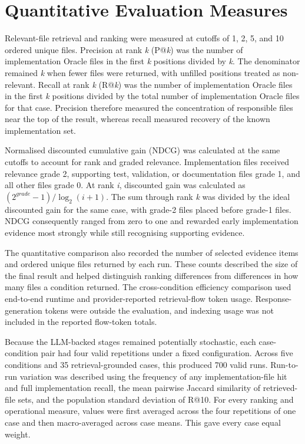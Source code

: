 \section{Quantitative Evaluation Measures}\label{sec:quantitative-evaluation-measures}

Relevant-file retrieval and ranking were measured at cutoffs of 1, 2, 5, and 10 ordered unique files. Precision at rank \emph{k} (P@\emph{k}) was the number of implementation Oracle files in the first \emph{k} positions divided by \emph{k}. The denominator remained \emph{k} when fewer files were returned, with unfilled positions treated as non-relevant. Recall at rank \emph{k} (R@\emph{k}) was the number of implementation Oracle files in the first \emph{k} positions divided by the total number of implementation Oracle files for that case. Precision therefore measured the concentration of responsible files near the top of the result, whereas recall measured recovery of the known implementation set.

Normalised discounted cumulative gain (NDCG) was calculated at the same cutoffs to account for rank and graded relevance. Implementation files received relevance grade 2, supporting test, validation, or documentation files grade 1, and all other files grade 0. At rank \emph{i}, discounted gain was calculated as $(2^{grade}-1)/\log_2(i+1)$. The sum through rank \emph{k} was divided by the ideal discounted gain for the same case, with grade-2 files placed before grade-1 files. NDCG consequently ranged from zero to one and rewarded early implementation evidence most strongly while still recognising supporting evidence.

The quantitative comparison also recorded the number of selected evidence items and ordered unique files returned by each run. These counts described the size of the final result and helped distinguish ranking differences from differences in how many files a condition returned. The cross-condition efficiency comparison used end-to-end runtime and provider-reported retrieval-flow token usage. Response-generation tokens were outside the evaluation, and indexing usage was not included in the reported flow-token totals.

Because the LLM-backed stages remained potentially stochastic, each case-condition pair had four valid repetitions under a fixed configuration. Across five conditions and 35 retrieval-grounded cases, this produced 700 valid runs. Run-to-run variation was described using the frequency of any implementation-file hit and full implementation recall, the mean pairwise Jaccard similarity of retrieved-file sets, and the population standard deviation of R@10. For every ranking and operational measure, values were first averaged across the four repetitions of one case and then macro-averaged across case means. This gave every case equal weight.

